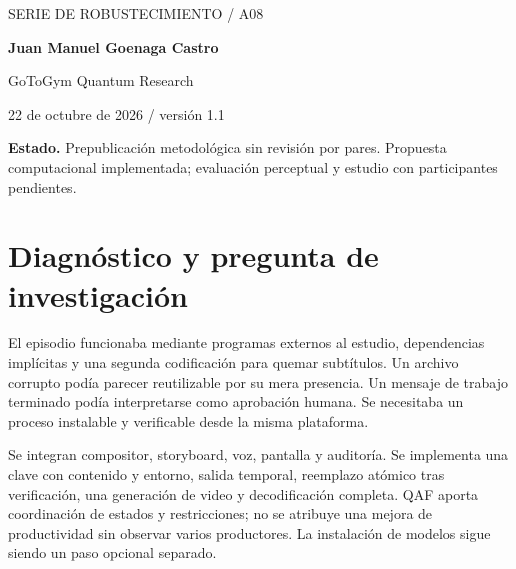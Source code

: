\documentclass[10pt,a4paper]{article}
\begin{document}
\begin{center}{\sffamily\small\textcolor{mint}{SERIE DE ROBUSTECIMIENTO / A08}}\par\vspace{10pt}{\sffamily\LARGE\bfseries\textcolor{ink}{Operación reproducible y entrega verificable}}\par\vspace{7pt}{\large Caché por contenido, salida atómica y estudio integrado}\par\vspace{12pt}\textbf{Juan Manuel Goenaga Castro}\par GoToGym Quantum Research\par 22 de octubre de 2026 / versión 1.1\end{center}\colorbox{ink!6}{\parbox{.96\linewidth}{\small\textbf{Estado.} Prepublicación metodológica sin revisión por pares. Propuesta computacional implementada; evaluación perceptual y estudio con participantes pendientes.}}\begin{abstract}Se integran compositor, storyboard, voz, pantalla y auditoría. Se implementa una clave con contenido y entorno, salida temporal, reemplazo atómico tras verificación, una generación de video y decodificación completa. QAF aporta coordinación de estados y restricciones; no se atribuye una mejora de productividad sin observar varios productores. La instalación de modelos sigue siendo un paso opcional separado. Se presenta el problema observado, una formalización con unidades y restricciones, el código correspondiente y sus controles. Se distingue la verificación de ingeniería de calidad percibida, identidad regional y efecto comercial. El uso QAF corresponde a la región clásica identificable y conserva un comparador con los mismos recursos.\end{abstract}
\section{Diagnóstico y pregunta de investigación}
El episodio funcionaba mediante programas externos al estudio, dependencias implícitas y una segunda codificación para quemar subtítulos. Un archivo corrupto podía parecer reutilizable por su mera presencia. Un mensaje de trabajo terminado podía interpretarse como aprobación humana. Se necesitaba un proceso instalable y verificable desde la misma plataforma.

Se integran compositor, storyboard, voz, pantalla y auditoría. Se implementa una clave con contenido y entorno, salida temporal, reemplazo atómico tras verificación, una generación de video y decodificación completa. QAF aporta coordinación de estados y restricciones; no se atribuye una mejora de productividad sin observar varios productores. La instalación de modelos sigue siendo un paso opcional separado.
\end{document}
